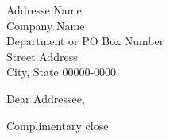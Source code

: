 \documentclass[paper=letter,pagesize]{scrlttr2}
\begin{document}
\begin{letter}{%
    Addresse Name\\
    Company Name\\
    Department or PO Box Number\\
    Street Address\\
    City, State 00000-0000
}
\opening{Dear Addressee,}
\lipsum[1-2]
\closing{Complimentary close}
\end{letter}
\end{document}
